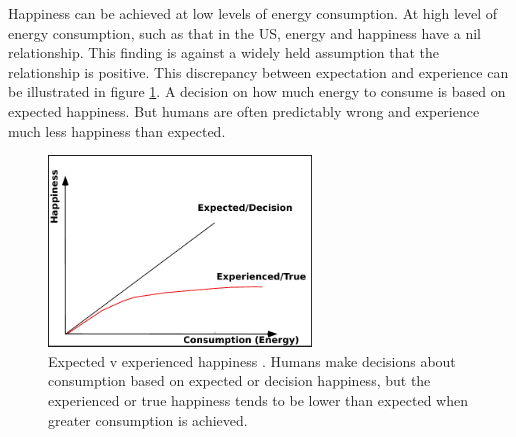 \documentclass[10pt, letterpaper]{article}
\begin{document}
\begin{spacing}{1.4}
%

Happiness can be achieved at low levels of
energy consumption. At high level of energy consumption, such as
that in the  US, energy and happiness have a nil relationship. %
 This finding is against a widely held assumption that the relationship is
positive. This discrepancy between expectation and experience can be illustrated
  in figure \ref{fUT}. A decision on how much
energy to  consume is based on expected happiness. But humans are
often predictably wrong and experience much less happiness than expected.

\begin{figure}[H]
  \begin{centering}
    \includegraphics[height=2.0in]{graphsAndTables/utility}
    \caption{Expected v experienced  happiness \cite{kahneman97ws}. Humans make
       decisions about consumption based on expected or
      decision happiness, but the experienced or true happiness tends to be 
      lower than expected when greater consumption is achieved.}\label{fUT}
  \end{centering}
\end{figure}



\end{spacing}
\end{document}
